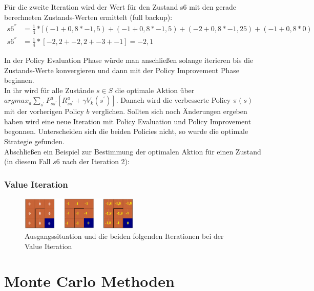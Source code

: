 \documentclass[10pt]{scrartcl}
\begin{document}
Für die zweite Iteration wird der Wert für den Zustand s6 mit den gerade berechneten Zustands-Werten ermittelt (full backup):
\begin{align}
	s6^{''} &= \frac{1}{4} * [(-1 + 0,8 * -1,5) + (-1 + 0,8 * -1,5) + (-2 + 0,8 * -1,25) + (-1 + 0,8 * 0)\\
	s6^{''} &= \frac{1}{4} * [ -2,2 + -2,2 + -3 + -1 ] = -2,1
\end{align}

In der Policy Evaluation Phase würde man anschließen solange iterieren bis die Zustands-Werte konvergieren und dann mit der Policy Improvement Phase beginnen.\\
In ihr wird für alle Zustände $s \in S$ die optimale Aktion über 
$argmax_{a} \sum_{s^{'}} P^a_{ss^{'}} [R^a_{ss^{'}} + \gamma V_{k} (s^{'})]$. 
Danach wird die verbesserte Policy $\pi(s)$ mit der vorherigen Policy $b$ verglichen.
Sollten sich noch Änderungen ergeben haben wird eine neue Iteration mit Policy Evaluation und Policy Improvement begonnen.
Unterscheiden sich die beiden Policies nicht, so wurde die optimale Strategie gefunden.\\

Abschließen ein Beispiel zur Bestimmung der optimalen Aktion für einen Zustand (in diesem Fall $s6$ nach der Iteration 2):


\subsubsection{Value Iteration}

\begin{figure}[htbp]
	\centering	\includegraphics[width=0.5\textwidth]{Bilder/ValueIterationAufgabe}
	\caption{Ausgangssituation und die beiden folgenden Iterationen bei der Value Iteration}
	\label{fig:value_aufgabe}
\end{figure}


\section{Monte Carlo Methoden}
\end{document}
